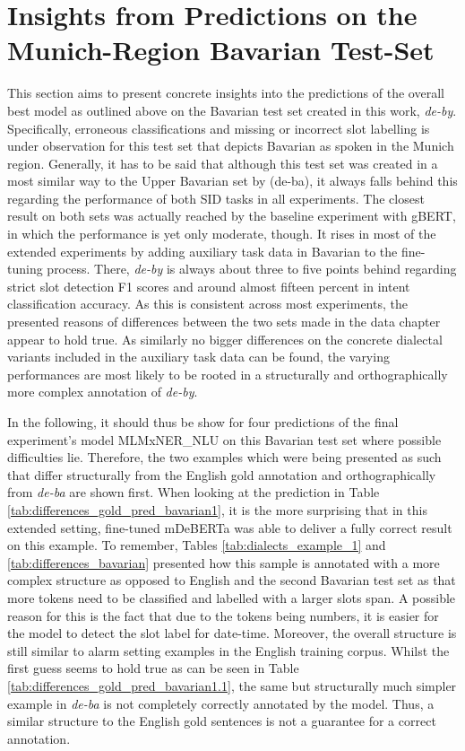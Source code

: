 \documentclass[11pt,a4paper,twoside,openright]{scrbook}
\begin{document}
\section{Insights from Predictions on the Munich-Region Bavarian Test-Set}

This section aims to present concrete insights into the predictions of the overall best model as outlined above on the Bavarian test set created in this work, \textit{de-by}. Specifically, erroneous classifications and missing or incorrect slot labelling is under observation for this test set that depicts Bavarian as spoken in the Munich region. Generally, it has to be said that although this test set was created in a most similar way to the Upper Bavarian set by \citet{winkler-etal-2024-slot-intent} (de-ba), it always falls behind this regarding the performance of both SID tasks in all experiments. The closest result on both sets was actually reached by the baseline experiment with gBERT, in which the performance is yet only moderate, though. It rises in most of the extended experiments by adding auxiliary task data in Bavarian to the fine-tuning process. There, \textit{de-by} is always about three to five points behind regarding strict slot detection F1 scores and around almost fifteen percent in intent classification accuracy. As this is consistent across most experiments, the presented reasons of differences between the two sets made in the data chapter appear to hold true. As similarly no bigger differences on the concrete dialectal variants included in the auxiliary task data can be found, the varying performances are most likely to be rooted in a structurally and orthographically more complex annotation of \textit{de-by}.

In the following, it should thus be show for four predictions of the final experiment's model MLMxNER\_NLU on this Bavarian test set where possible difficulties lie. Therefore, the two examples which were being presented as such that differ structurally from the English gold annotation and orthographically from \textit{de-ba} are shown first. When looking at the prediction in Table \ref{tab:differences_gold_pred_bavarian1}, it is the more surprising that in this extended setting, fine-tuned mDeBERTa was able to deliver a fully correct result on this example. To remember, Tables \ref{tab:dialects_example_1} and \ref{tab:differences_bavarian} presented how this sample is annotated with a more complex structure as opposed to English and the second Bavarian test set as that more tokens need to be classified and labelled with a larger slots span. A possible reason for this is the fact that due to the tokens being numbers, it is easier for the model to detect the slot label for date-time. Moreover, the overall structure is still similar to alarm setting examples in the English training corpus. Whilst the first guess seems to hold true as can be seen in Table \ref{tab:differences_gold_pred_bavarian1.1}, the same but structurally much simpler example in \textit{de-ba} is not completely correctly annotated by the model. Thus, a similar structure to the English gold sentences is not a guarantee for a correct annotation.
\end{document}
